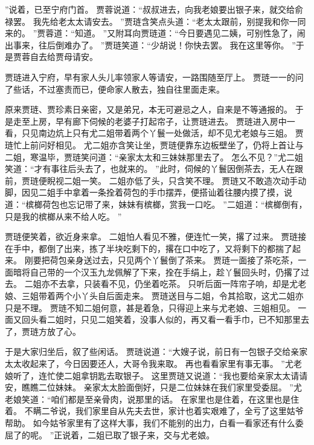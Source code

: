”说着，已至宁府门首。
贾蓉说道：“叔叔进去，向我老娘要出银子来，就交给俞禄罢。
我先给老太太请安去。
”贾琏含笑点头道：“老太太跟前，别提我和你一同来的。
”贾蓉道：“知道。
”又附耳向贾琏道：“今日要遇见二姨，可别性急了，闹出事来，往后倒难办了。
”贾琏笑道：“少胡说！你快去罢。
我在这里等你。
”于是贾蓉自去给贾母请安。
\par
贾琏进入宁府，早有家人头儿率领家人等请安，一路围随至厅上。
贾琏一一的问了些话，不过塞责而已，便命家人散去，独自往里面走来。
\par
原来贾琏、贾珍素日亲密，又是弟兄，本无可避忌之人，自来是不等通报的。
于是走至上房，早有廊下伺候的老婆子打起帘子，让贾琏进去。
贾琏进入房中一看，只见南边炕上只有尤二姐带着两个丫鬟一处做活，却不见尤老娘与三姐。
贾琏忙上前问好相见。
尤二姐亦含笑让坐，贾琏便靠东边板壁坐了，仍将上首让与二姐，寒温毕，贾琏笑问道：“亲家太太和三妹妹那里去了。
怎么不见？”尤二姐笑道：“才有事往后头去了，也就来的。
”此时，伺候的丫鬟因倒茶去，无人在跟前，贾琏便睨视二姐一笑。
二姐亦低了头，只含笑不理。
贾琏又不敢造次动手动脚，因见二姐手中拿着一条拴着荷包的手巾摆弄，便搭讪着往腰内摸了摸，说道：“槟榔荷包也忘记带了来，妹妹有槟榔，赏我一口吃。
”二姐道：“槟榔倒有，只是我的槟榔从来不给人吃。
”\par
贾琏便笑着，欲近身来拿。
二姐怕人看见不雅，便连忙一笑，撂了过来。
贾琏接在手中，都倒了出来，拣了半块吃剩下的，撂在口中吃了，又将剩下的都揣了起来。
刚要把荷包亲身送过去，只见两个丫鬟倒了茶来。
贾琏一面接了茶吃茶，一面暗将自己带的一个汉玉九龙佩解了下来，拴在手绢上，趁丫鬟回头时，仍撂了过去。
二姐亦不去拿，只装看不见，仍坐着吃茶。
只听后面一阵帘子响，却是尤老娘、三姐带着两个小丫头自后面走来。
贾琏送目与二姐，令其拾取，这尤二姐亦只是不理。
贾琏不知二姐何意，甚是着急，只得迎上来与尤老娘、三姐相见。
一面又回头看二姐时，只见二姐笑着，没事人似的，再又看一看手巾，已不知那里去了，贾琏方放了心。
\par
于是大家归坐后，叙了些闲话。
贾琏说道：“大嫂子说，前日有一包银子交给亲家太太收起来了，今日因要还人，大哥令我来取。
再也看看家里有事无事。
”尤老娘听了，连忙使二姐拿钥匙去取银子。
这里贾琏又说道：“我也要给亲家太太请请安，瞧瞧二位妹妹。
亲家太太脸面倒好，只是二位妹妹在我们家里受委屈。
”尤老娘笑道：“咱们都是至亲骨肉，说那里的话。
在家里也是住着，在这里也是住着。
不瞒二爷说，我们家里自从先夫去世，家计也着实艰难了，全亏了这里姑爷帮助。
如今姑爷家里有了这样大事，我们不能别的出力，白看一看家还有什么委屈了的呢。
”正说着，二姐已取了银子来，交与尤老娘。
